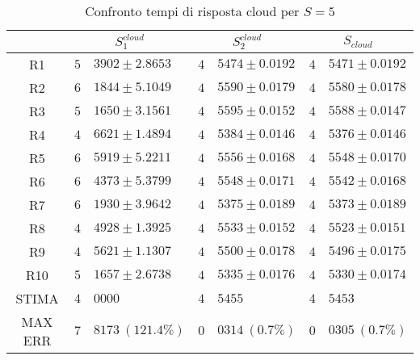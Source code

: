 \begin{table}[!h]
\begin{tabular}{c|r@{.}l|r@{.}l|r@{.}l}
& \multicolumn{2}{|c|}{$S_1^{cloud}$}
& \multicolumn{2}{|c|}{$S_2^{cloud}$}
& \multicolumn{2}{|c}{$S_{cloud}$} 
\\          
\hline
R1      & $5$&$3902 \pm 2.8653$  & $4$&$5474 \pm 0.0192$ & $4$&$5471 \pm 0.0192$ \\
R2      & $6$&$1844 \pm 5.1049$  & $4$&$5590 \pm 0.0179$ & $4$&$5580 \pm 0.0178$ \\
R3      & $5$&$1650 \pm 3.1561$  & $4$&$5595 \pm 0.0152$ & $4$&$5588 \pm 0.0147$ \\
R4      & $4$&$6621 \pm 1.4894$  & $4$&$5384 \pm 0.0146$ & $4$&$5376 \pm 0.0146$ \\
R5      & $6$&$5919 \pm 5.2211$  & $4$&$5556 \pm 0.0168$ & $4$&$5548 \pm 0.0170$ \\
R6      & $6$&$4373 \pm 5.3799$  & $4$&$5548 \pm 0.0171$ & $4$&$5542 \pm 0.0168$ \\
R7      & $6$&$1930 \pm 3.9642$  & $4$&$5375 \pm 0.0189$ & $4$&$5373 \pm 0.0189$ \\
R8      & $4$&$4928 \pm 1.3925$  & $4$&$5533 \pm 0.0152$ & $4$&$5523 \pm 0.0151$ \\
R9      & $4$&$5621 \pm 1.1307$  & $4$&$5500 \pm 0.0178$ & $4$&$5496 \pm 0.0175$ \\
R10     & $5$&$1657 \pm 2.6738$  & $4$&$5335 \pm 0.0176$ & $4$&$5330 \pm 0.0174$ \\
STIMA   & $4$&$0000$             & $4$&$5455$            & $4$&$5453$            \\
MAX ERR & $7$&$8173 \ (121.4\%)$ & $0$&$0314 \ (0.7\%)$  & $0$&$0305 \ (0.7\%)$    
\end{tabular}
\centering
\caption{Confronto tempi di risposta cloud per $S=5$}
\label{tab:5_scloud}
\end{table}
